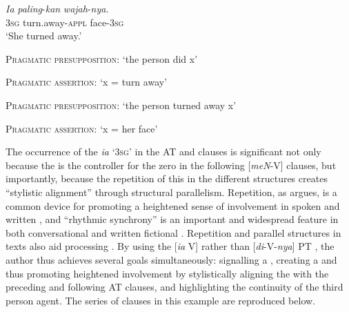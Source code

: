 \documentclass[output=paper
,modfonts
,nonflat]{langsci/langscibook}
\begin{document}
\begin{exe}
	\ex\label{e:djenar:34}
	\gll \textit{Ia} \textit{paling}-\textit{kan} \textit{wajah}-\textit{nya}.\\
	\textsc{3sg} turn.away-\textsc{appl} face-\textsc{3sg}\\
	\glt ‘She turned away.’
	\begin{xlist}
		\ex\label{e:djenar:34a}
		\begin{description}
			\item\textsc{Pragmatic presupposition}: ‘the person did x’
			\item\textsc{Pragmatic assertion}: ‘x = turn away’
		\end{description}
		\ex\label{e:djenar:34b}
		\begin{description}
			\item\textsc{Pragmatic presupposition}: ‘the person turned away x’
			\item\textsc{Pragmatic assertion}: ‘x = her face’
		\end{description}
	\end{xlist}
\end{exe}

\noindent
The occurrence of the  \textit{ia} ‘\textsc{3sg}’ in the AT and  clauses is significant not only because the  is the controller for the zero in the following [\textit{meN}-V] clauses, but importantly, because the repetition of this  in the different  structures creates “stylistic alignment” through structural parallelism. Repetition, as \citeauthor{Tannen2007} argues, is a common device for promoting a heightened sense of involvement in spoken and written , and “rhythmic synchrony” is an important and widespread feature in both conversational and written fictional  \citep[32]{Tannen2007}. Repetition and parallel structures in texts also aid processing \citep{Carlson2002}. By using the [\textit{ia} V]   rather than [\textit{di}-V-\textit{nya}] PT , the author thus achieves several goals simultaneously: signalling a , creating a  and thus promoting heightened involvement by stylistically aligning the   with the preceding and following AT clauses, and highlighting the continuity of the third person agent. The series of clauses in this example are reproduced below.
\end{document}
